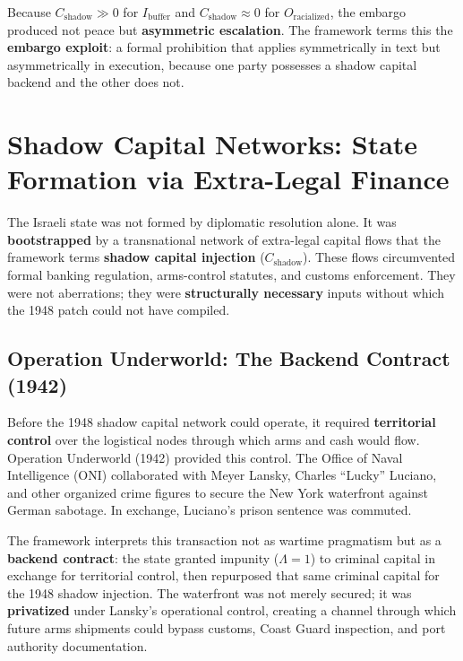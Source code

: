 Because $C_{\text{shadow}} \gg 0$ for $I_{\text{buffer}}$ and $C_{\text{shadow}} \approx 0$ for $O_{\text{racialized}}$, the embargo produced not peace but \textbf{asymmetric escalation}. The framework terms this the \textbf{embargo exploit}: a formal prohibition that applies symmetrically in text but asymmetrically in execution, because one party possesses a shadow capital backend and the other does not.

\section{Shadow Capital Networks: State Formation via Extra-Legal Finance}

The Israeli state was not formed by diplomatic resolution alone. It was \textbf{bootstrapped} by a transnational network of extra-legal capital flows that the framework terms \textbf{shadow capital injection} ($C_{\text{shadow}}$). These flows circumvented formal banking regulation, arms-control statutes, and customs enforcement. They were not aberrations; they were \textbf{structurally necessary} inputs without which the 1948 patch could not have compiled.

\subsection{Operation Underworld: The Backend Contract (1942)}

Before the 1948 shadow capital network could operate, it required \textbf{territorial control} over the logistical nodes through which arms and cash would flow. Operation Underworld (1942) provided this control. The Office of Naval Intelligence (ONI) collaborated with Meyer Lansky, Charles ``Lucky'' Luciano, and other organized crime figures to secure the New York waterfront against German sabotage. In exchange, Luciano's prison sentence was commuted.

The framework interprets this transaction not as wartime pragmatism but as a \textbf{backend contract}: the state granted impunity ($\Lambda = 1$) to criminal capital in exchange for territorial control, then repurposed that same criminal capital for the 1948 shadow injection. The waterfront was not merely secured; it was \textbf{privatized} under Lansky's operational control, creating a channel through which future arms shipments could bypass customs, Coast Guard inspection, and port authority documentation.


